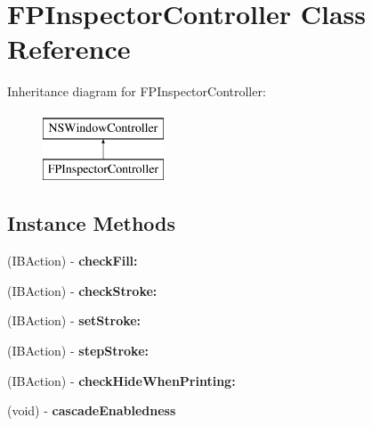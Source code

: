 \hypertarget{interface_f_p_inspector_controller}{}\section{F\+P\+Inspector\+Controller Class Reference}
\label{interface_f_p_inspector_controller}
Inheritance diagram for F\+P\+Inspector\+Controller\+:\begin{figure}[H]
\begin{center}
\leavevmode
\includegraphics[height=2.000000cm]{interface_f_p_inspector_controller}
\end{center}
\end{figure}
\subsection*{Instance Methods}
\begin{DoxyCompactItemize}
\item 
\mbox{\label{interface_f_p_inspector_controller_a32bf7ad5aef59253bb48afe7e892c134}} 
(I\+B\+Action) -\/ {\bfseries check\+Fill\+:}
\item 
\mbox{\label{interface_f_p_inspector_controller_a81752a56b21c45f80e65fb7788d4a551}} 
(I\+B\+Action) -\/ {\bfseries check\+Stroke\+:}
\item 
\mbox{\label{interface_f_p_inspector_controller_ac72502eac766f6d31b5af079dcded8d6}} 
(I\+B\+Action) -\/ {\bfseries set\+Stroke\+:}
\item 
\mbox{\label{interface_f_p_inspector_controller_ad58e1e2884dda52fcf63df1a76ed5814}} 
(I\+B\+Action) -\/ {\bfseries step\+Stroke\+:}
\item 
\mbox{\label{interface_f_p_inspector_controller_a73d3abab8f367a1f47fa5e4f5aa3b5a3}} 
(I\+B\+Action) -\/ {\bfseries check\+Hide\+When\+Printing\+:}
\item 
\mbox{\label{interface_f_p_inspector_controller_acef33fddbb40d497128b210a41af37c0}} 
(void) -\/ {\bfseries cascade\+Enabledness}
\end{DoxyCompactItemize}
